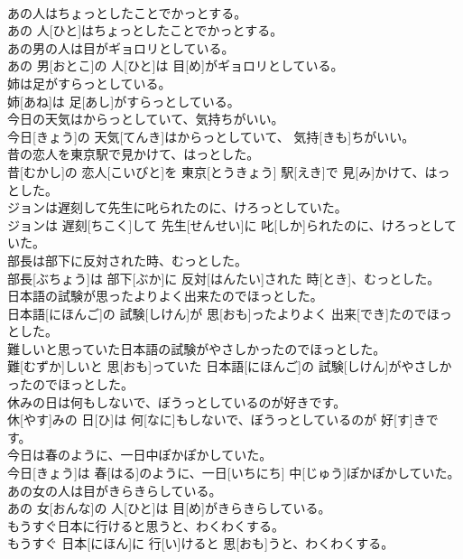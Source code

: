 \documentclass[8pt]{extreport}
\begin{document}
\begin{CJK}{UTF8}{min}
\\	あの人はちょっとしたことでかっとする。	
\\	あの 人[ひと]はちょっとしたことでかっとする。
\\	あの男の人は目がギョロリとしている。	
\\	あの 男[おとこ]の 人[ひと]は 目[め]がギョロリとしている。
\\	姉は足がすらっとしている。	
\\	姉[あね]は 足[あし]がすらっとしている。
\\	今日の天気はからっとしていて、気持ちがいい。	
\\	今日[きょう]の 天気[てんき]はからっとしていて、 気持[きも]ちがいい。
\\	昔の恋人を東京駅で見かけて、はっとした。	
\\	昔[むかし]の 恋人[こいびと]を 東京[とうきょう] 駅[えき]で 見[み]かけて、はっとした。
\\	ジョンは遅刻して先生に叱られたのに、けろっとしていた。	
\\	ジョンは 遅刻[ちこく]して 先生[せんせい]に 叱[しか]られたのに、けろっとしていた。
\\	部長は部下に反対された時、むっとした。	
\\	部長[ぶちょう]は 部下[ぶか]に 反対[はんたい]された 時[とき]、むっとした。
\\	日本語の試験が思ったよりよく出来たのでほっとした。	
\\	日本語[にほんご]の 試験[しけん]が 思[おも]ったよりよく 出来[でき]たのでほっとした。
\\	難しいと思っていた日本語の試験がやさしかったのでほっとした。	
\\	難[むずか]しいと 思[おも]っていた 日本語[にほんご]の 試験[しけん]がやさしかったのでほっとした。
\\	休みの日は何もしないで、ぼうっとしているのが好きです。	
\\	休[やす]みの 日[ひ]は 何[なに]もしないで、ぼうっとしているのが 好[す]きです。
\\	今日は春のように、一日中ぽかぽかしていた。	
\\	今日[きょう]は 春[はる]のように、一日[いちにち] 中[じゅう]ぽかぽかしていた。
\\	あの女の人は目がきらきらしている。	
\\	あの 女[おんな]の 人[ひと]は 目[め]がきらきらしている。
\\	もうすぐ日本に行けると思うと、わくわくする。	
\\	もうすぐ 日本[にほん]に 行[い]けると 思[おも]うと、わくわくする。

\end{CJK}
\end{document}
